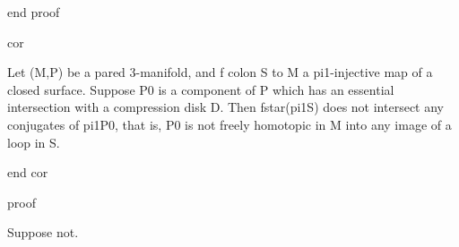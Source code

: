 end proof

cor

Let (M,P) be a pared 3-manifold, and f colon S to M a pi1-injective map of
a closed surface. Suppose P0 is a component of P which has an essential
intersection with a compression disk D. Then fstar(pi1S) does not intersect any
conjugates of pi1P0, that is, P0 is not freely homotopic in M into any image of
a loop in S.

end cor

proof

Suppose not. 

